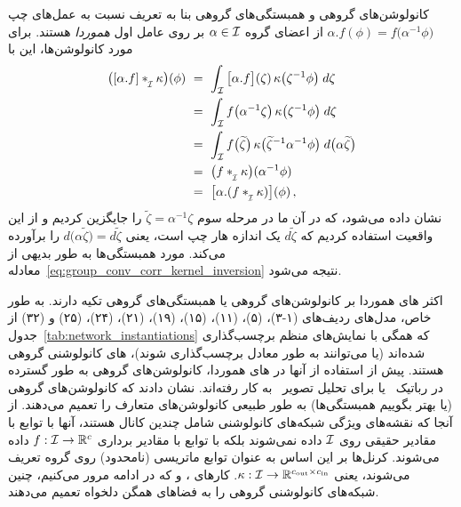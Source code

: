 کانولوشن‌های گروهی و همبستگی‌های گروهی بنا به تعریف نسبت به عمل‌های چپ $\alpha.f(\phi) = f\big( \alpha^{-1}\phi \big)$ از اعضای گروه $\alpha\in\mathcal{I}$ بر روی عامل اول \emph{هموردا} هستند.
برای مورد کانولوشن‌ها، این با
\begin{align}\label{eq:group_conv_equivariance}
	\big( [\alpha.f] \ast_{\overset{}{\protect\scalebox{.64}{$\mkern-.5mu \I$}}} \kappa \big)(\phi)
	\ &=\ \int_{\I} \big[\alpha.f \big](\zeta)\, \kappa\big( \zeta^{-1} \phi \big) \; d\zeta \notag \\
	\ &=\ \int_{\I} f\big( \alpha^{-1} \zeta\big)\, \kappa\big( \zeta^{-1} \phi \big) \; d\zeta \notag \\
	\ &=\ \int_{\I} f\big(\widetilde{\zeta} \big)\, \kappa\big( \widetilde{\zeta}^{-1} \alpha^{-1} \phi \big) \; d\big( \alpha \widetilde{\zeta} \big) \notag \\
	\ &=\ \big( f \ast_{\overset{}{\protect\scalebox{.64}{$\mkern-.5mu \I$}}} \kappa \big) (\alpha^{-1} \phi) \notag \\
	\ &=\ \big[\alpha.( f \ast_{\overset{}{\protect\scalebox{.64}{$\mkern-.5mu \I$}}} \kappa )\big] (\phi) \,,
\end{align}
نشان داده می‌شود، که در آن ما در مرحله سوم $\widetilde{\zeta} = \alpha^{-1}\zeta$ را جایگزین کردیم و از این واقعیت استفاده کردیم که $d\widetilde{\zeta}$ یک اندازه هار چپ است، یعنی $d\big(\alpha \widetilde{\zeta}\big) = d\widetilde{\zeta}$ را برآورده می‌کند.
مورد همبستگی‌ها به طور بدیهی از معادله~\eqref{eq:group_conv_corr_kernel_inversion} نتیجه می‌شود.


اکثر های هموردا بر کانولوشن‌های گروهی یا همبستگی‌های گروهی تکیه دارند.
به طور خاص، مدل‌های ردیف‌های (۱-۳)، (۵)، (۱۱)، (۱۵)، (۱۹)، (۲۱)، (۲۴)، (۲۵) و (۳۲) از جدول~\ref{tab:network_instantiations} که همگی با نمایش‌های منظم برچسب‌گذاری شده‌اند (یا می‌توانند به طور معادل برچسب‌گذاری شوند)، های کانولوشنی گروهی هستند.
پیش از استفاده از آنها در های هموردا، کانولوشن‌های گروهی به طور گسترده در رباتیک~\cite{chirikjian1998numerical} یا برای تحلیل تصویر~\cite{mallat2012group,sifre2012combined,Sifre2013-GSCAT,bruna2013invariant,sifre2014rigid,oyallon2015scattering} به کار رفته‌اند.
\citet{Cohen2016-GCNN} نشان دادند که کانولوشن‌های گروهی (یا بهتر بگوییم همبستگی‌ها) به طور طبیعی کانولوشن‌های متعارف را تعمیم می‌دهند.
از آنجا که نقشه‌های ویژگی شبکه‌های کانولوشنی شامل چندین کانال هستند، آنها با توابع با مقادیر حقیقی روی $\mathcal{I}$ داده نمی‌شوند بلکه با توابع با مقادیر برداری $f: \mathcal{I} \to \mathbb{R}^c$ داده می‌شوند.
کرنل‌ها بر این اساس به عنوان توابع ماتریسی (نامحدود) روی گروه تعریف می‌شوند، یعنی $\kappa: \mathcal{I} \to \mathbb{R}^{{c_\textup{out}}\times{c_\textup{in}}}$.
کارهای \citet{Kondor2018-GENERAL}، \citet{bekkers2020bspline} و \citet{Cohen2018-intertwiners}\cite{Cohen2019-generaltheory} که در ادامه مرور می‌کنیم، چنین شبکه‌های کانولوشنی گروهی را به فضاهای همگن دلخواه تعمیم می‌دهند.







